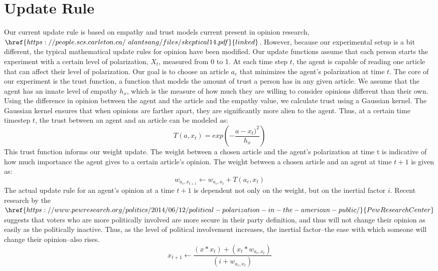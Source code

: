 \documentclass[11pt,reqno]{proc}
\begin{document}
\section {Update Rule}
\hspace{\parindent} Our current update rule is based on empathy and trust models current present in opinion research, $\href{https://people.scs.carleton.ca/~alantsang/files/skeptical14.pdf}{linked}$. However, because our experimental setup is a bit different, the typical mathematical update rules for opinion have been modified. Our update functions assume that each person starts the experiment with a certain level of polarization, $X_t$, measured from 0 to 1. At each time step $t$, the agent is capable of reading one article that can affect their level of polarization. Our goal is to choose an article $a_c$ that minimizes the agent’s polarization at time $t$.
\hspace{\parindent} The core of our experiment is the trust function, a function that models the amount of trust a person has in any given article. We assume that the agent has an innate level of empathy $h_x$, which is the measure of how much they are willing to consider opinions different than their own. Using the difference in opinion between the agent and the article and the empathy value, we calculate trust using a Gaussian kernel. The Gaussian kernel ensures that when opinions are farther apart, they are significantly more alien to the agent. Thus, at a certain time timestep $t$, the trust between an agent and an article can be modeled as:
$$T(a,x_t) = exp(-\frac{a-x_t)^2}{h_x})$$ 
This trust function informs our weight update. The weight between a chosen article and the agent’s polarization at time t is indicative of how much importance the agent gives to a certain article’s opinion. The weight between a chosen article and an agent at time $t+1$ is given as: 
$$w_{a_c,x_{t+1}} \leftarrow w_{a_c,x_t} + T(a_c,x_t)$$
\hspace{\parindent} The actual update rule for an agent’s opinion at a time $t + 1$ is dependent not only on the weight, but on the inertial factor $i$.
Recent research by the $\href{https://www.pewresearch.org/politics/2014/06/12/political-polarization-in-the-american-public/}{Pew Research Center}$ suggests that voters who are more politically involved are more secure in their party definition, and thus will not change their opinion as easily as the politically inactive. Thus, as the level of political involvement increases, the inertial factor--the ease with which someone will change their opinion--also rises.
$$x_{t+1} \leftarrow \frac{(x*x_t) + (x_t * w_{a_c,x_t})}{(i+w_{a_c,x_t})}$$
\end{document}
